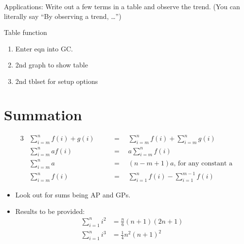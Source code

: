 \documentclass[oneside]{book}
\begin{document}
\begin{IN}
  Applications: Write out a few terms in a table and observe the trend. (You can literally say ``By observing a trend, \ldots'')
\end{IN}
\begin{GCSkills}{}
  Table function
  \begin{enumerate}
    \item Enter eqn into GC.
    \item 2nd graph to show table
    \item 2nd tblset for setup options
  \end{enumerate}
\end{GCSkills}
\section{Summation}
\begin{fact}
  \begin{alignat*}{3}
    &\sum_{i=m}^{n}{f(i)+g(i)}\quad& &=\quad \sum_{i=m}^{n}{f(i)}+\sum_{i=m}^{n}{g(i)}\\
    &\sum_{i=m}^{n}{af(i)}& &=\quad a\sum_{i=m}^{n}{f(i)}\\
    &\sum_{i=m}^{n}{a}& &=\quad (n-m+1)a\text{, for any constant a}\\
    &\sum_{i=m}^{n}{f(i)}& &=\quad \sum_{i=1}^{n}{f(i)}-\sum_{i=1}^{m-1}{f(i)} 
  \end{alignat*}
\end{fact}
\begin{note}
  \begin{itemize}
    \item Look out for sums being AP and GPs.
    \item Results to be provided:
    \begin{align*}
      \sum_{i=1}^{n}{i^2}&=\frac{n}{6}(n+1)(2n+1)\\
      \sum_{i=1}^{n}{i^3}&=\frac{1}{4}n^2(n+1)^2
    \end{align*}
  \end{itemize}
\end{note}
\end{document}

